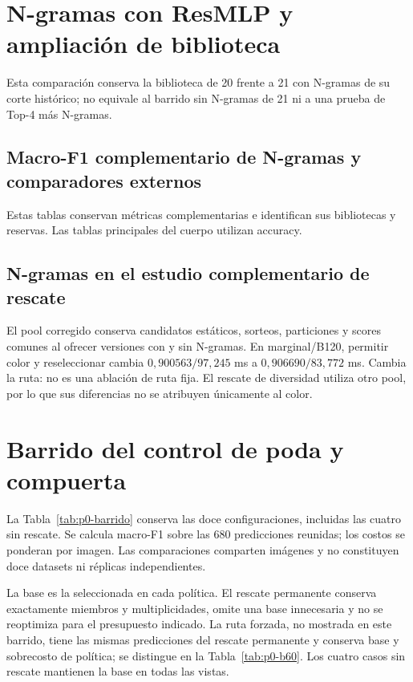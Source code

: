 \section{N-gramas con ResMLP y ampliación de biblioteca}

Esta comparación conserva la biblioteca de 20 frente a 21 con N-gramas de su corte histórico; no equivale al barrido sin N-gramas de 21 ni a una prueba de Top-4 más N-gramas.

\subsection{Macro-F1 complementario de N-gramas y comparadores externos}



Estas tablas conservan métricas complementarias e identifican sus bibliotecas y reservas. Las tablas principales del cuerpo utilizan accuracy.

\subsection{N-gramas en el estudio complementario de rescate}
El pool corregido conserva candidatos estáticos, sorteos, particiones y scores comunes al ofrecer versiones con y sin N-gramas. En marginal/B120, permitir color y reseleccionar cambia $0{,}900563/97{,}245$ ms a $0{,}906690/83{,}772$ ms. Cambia la ruta: no es una ablación de ruta fija. El rescate de diversidad utiliza otro pool, por lo que sus diferencias no se atribuyen únicamente al color.


\section{Barrido del control de poda y compuerta}\label{sec:anexo-p0}
La Tabla~\ref{tab:p0-barrido} conserva las doce configuraciones, incluidas las cuatro sin rescate. Se calcula macro-F1 sobre las 680 predicciones reunidas; los costos se ponderan por imagen. Las comparaciones comparten imágenes y no constituyen doce datasets ni réplicas independientes.


\FloatBarrier

La base es la seleccionada en cada política. El rescate permanente conserva exactamente miembros y multiplicidades, omite una base innecesaria y no se reoptimiza para el presupuesto indicado. La ruta forzada, no mostrada en este barrido, tiene las mismas predicciones del rescate permanente y conserva base y sobrecosto de política; se distingue en la Tabla~\ref{tab:p0-b60}. Los cuatro casos sin rescate mantienen la base en todas las vistas.

